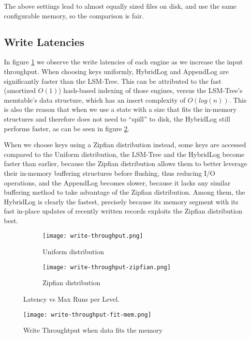 The above settings lead to almost equally sized files on disk, and use the same configurable memory, so the comparison is fair.

\subsection{Write Latencies}

In figure \ref{fig:comparison-write} we observe the write latencies of each engine as we increase the input throughput. When choosing keys uniformly, HybridLog and AppendLog are significantly faster than the LSM-Tree. This can be attributed to the fast (amortized $O(1)$) hash-based indexing of those engines, versus the LSM-Tree's memtable's data structure, which has an insert complexity of $O(log(n))$. This is also the reason that when we use a state with a size that fits the in-memory structures and therefore does not need to ``spill'' to disk, the HybridLog still performs faster, as can be seen in figure \ref{fig:comparison-write-fit-mem}.

When we choose keys using a Zipfian distribution instead, some keys are accessed compared to the Uniform distribution, the LSM-Tree and the HybridLog become faster than earlier, because the Zipfian distribution allows them to better leverage their in-memory buffering structures before flushing, thus reducing I/O operations, and the AppendLog becomes slower, because it lacks any similar buffering method to take advantage of the Zipfian distribution. Among them, the HybridLog is clearly the fastest, precisely because its memory segment with its fast in-place updates of recently written records exploits the Zipfian distribution best.


\begin{figure}[H]
    \begin{subfigure}{.5\textwidth}
        \centering
        \texttt{[image: write-throughput.png]}
        \caption{Uniform distribution}
    \end{subfigure}
    \begin{subfigure}{.5\textwidth}
        \centering
        \texttt{[image: write-throughput-zipfian.png]}
        \caption{Zipfian distribution}
    \end{subfigure}
    \caption{Latency vs Max Runs per Level.}
    \label{fig:comparison-write}
\end{figure}

\begin{figure}[H]
    \centering
    \texttt{[image: write-throughput-fit-mem.png]}
    \caption{Write Throughtput when data fits the memory}
    \label{fig:comparison-write-fit-mem}
\end{figure}

